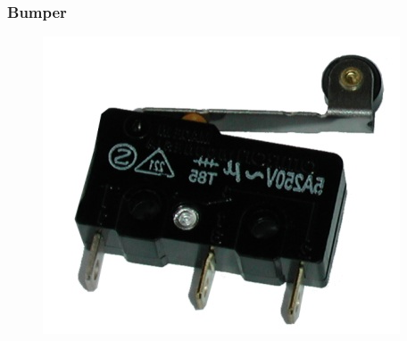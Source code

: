 \begin{frame}
    \frametitle{Bumper}
    
    \begin{figure}[!h]
        \centering
        \includegraphics[width=0.4\columnwidth]{images/bumper.png}
    \end{figure}

\end{frame}
